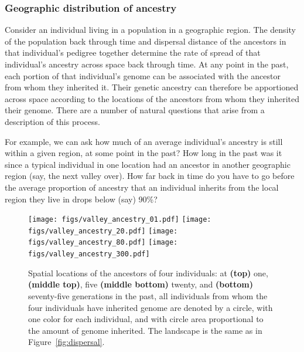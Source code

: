 \documentclass{ar-1col}
\newcommand{\g}[1]{{\color{blue}{#1}}}
\newcommand{\plr}[1]{{\color{green}{#1}}}
\newcommand{\todo}[1]{{\textbf{\color{red}{#1}}}}
\begin{document}
\subsubsection{Geographic distribution of ancestry}

Consider an individual living in a population in a geographic region.
The density of the population back through time and 
dispersal distance of the ancestors in that individual's pedigree 
together determine the rate of spread of that individual's ancestry 
across space back through time.
At any point in the past,
each portion of that individual's genome can be associated 
with the ancestor from whom they inherited it.
Their genetic ancestry can therefore be apportioned across space according
to the locations of the ancestors from whom they inherited their genome.
There are a number of natural questions that arise from a description of this process.

For example, we can ask how much of an average individual's ancestry is still within a given region, at some point in the past?
How long in the past was it since a typical individual in one location had an ancestor
in another geographic region (say, the next valley over).
How far back in time do you have to go before the average proportion of ancestry that an individual inherits
from the local region they live in drops below (say) 90\%?

\todo{tidy and conclude}

\begin{figure}[ht]
    \centering
        \texttt{[image: figs/valley\_ancestry\_01.pdf]}
        \texttt{[image: figs/valley\_ancestry\_20.pdf]}
        \texttt{[image: figs/valley\_ancestry\_80.pdf]}
        \texttt{[image: figs/valley\_ancestry\_300.pdf]}
        \caption{
            Spatial locations of the ancestors of four individuals:
            at 
            \textbf{(top)} one, 
            \textbf{(middle top)}, five
            \textbf{(middle bottom)} twenty, and
            \textbf{(bottom)} seventy-five generations in the past,
            all individuals from whom the four individuals have inherited genome are denoted by a circle,
            with one color for each individual,
            and with circle area proportional to the amount of genome inherited.
            The landscape is the same as in Figure~\ref{fig:dispersal}.
            \plr{this is too many: which ones to keep?}
            \g{I say keep 1, 20, and 75.  If you go back farther, 
            	does it get even clearer that the pedigrees have ``forgotten" which side of the ridge the modern inds are on? 
		If so, that might make the point more clearly.}
        }
        \label{ancestry_spread}
\end{figure}
\end{document}
